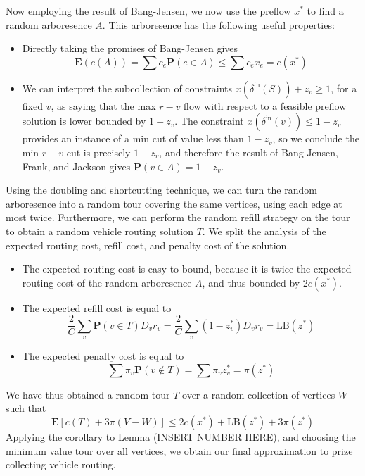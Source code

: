 \documentclass{article}
\theoremstyle{plain}
\theoremstyle{plain}
\begin{document}
Now employing the result of Bang-Jensen, we now use the preflow $x^*$ to find a random arboresence $A$. This arboresence has the following useful properties:
%
\begin{itemize}
    \item Directly taking the promises of Bang-Jensen gives
    \[ \mathbf{E}(c(A)) = \sum c_e \mathbf{P}(e \in A) \leq \sum c_e x_e = c(x^*) \]

    \item We can interpret the subcollection of constraints $x(\delta^{\text{in}}(S)) + z_v \geq 1$, for a fixed $v$, as saying that the max $r-v$ flow with respect to a feasible preflow solution is lower bounded by $1 - z_v$. The constraint $x(\delta^{\text{in}}(v)) \leq 1 - z_v$ provides an instance of a min cut of value less than $1 - z_v$, so we conclude the min $r-v$ cut is precisely $1 - z_v$, and therefore the result of Bang-Jensen, Frank, and Jackson gives $\mathbf{P}(v \in A) = 1 - z_v$.

\end{itemize}

Using the doubling and shortcutting technique, we can turn the random arboresence into a random tour covering the same vertices, using each edge at most twice. Furthermore, we can perform the random refill strategy on the tour to obtain a random vehicle routing solution $T$. We split the analysis of the expected routing cost, refill cost, and penalty cost of the solution.
%
\begin{itemize}
    \item The expected routing cost is easy to bound, because it is twice the expected routing cost of the random arboresence $A$, and thus bounded by $2c(x^*)$.

    \item The expected refill cost is equal to
    \[ \frac{2}{C} \sum_v \mathbf{P}(v \in T) D_v r_v = \frac{2}{C} \sum_v (1 - z^*_v) D_vr_v = \text{LB}(z^*) \]

    \item The expected penalty cost is equal to
    \[ \sum \pi_v \mathbf{P}(v \not \in T) = \sum \pi_vz^*_v = \pi(z^*) \]
\end{itemize}
%
We have thus obtained a random tour $T$ over a random collection of vertices $W$ such that
%
\[ \mathbf{E}[c(T) + 3\pi(V - W)] \leq 2c(x^*) + \text{LB}(z^*) + 3\pi(z^*) \]
%
Applying the corollary to Lemma (INSERT NUMBER HERE), and choosing the minimum value tour over all vertices, we obtain our final approximation to prize collecting vehicle routing.
\end{document}
